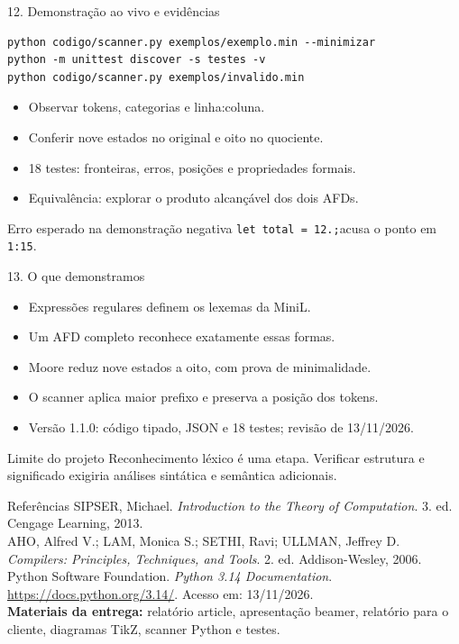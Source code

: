 \documentclass[aspectratio=169,11pt]{beamer}
\begin{document}
\begin{frame}[fragile]{12. Demonstração ao vivo e evidências}
\begin{lstlisting}[language={}]
python codigo/scanner.py exemplos/exemplo.min --minimizar
python -m unittest discover -s testes -v
python codigo/scanner.py exemplos/invalido.min
\end{lstlisting}
\begin{itemize}
\item Observar tokens, categorias e linha:coluna.
\item Conferir nove estados no original e oito no quociente.
\item 18 testes: fronteiras, erros, posições e propriedades formais.
\item Equivalência: explorar o produto alcançável dos dois AFDs.
\end{itemize}
\begin{alertblock}{Erro esperado na demonstração negativa}
\texttt{let total = 12.;}\quad acusa o ponto em \texttt{1:15}.
\end{alertblock}
\end{frame}

\begin{frame}{13. O que demonstramos}
\begin{itemize}
\item Expressões regulares definem os lexemas da MiniL.
\item Um AFD completo reconhece exatamente essas formas.
\item Moore reduz nove estados a oito, com prova de minimalidade.
\item O scanner aplica maior prefixo e preserva a posição dos tokens.
\item Versão 1.1.0: código tipado, JSON e 18 testes; revisão de 13/11/2026.
\end{itemize}
\begin{block}{Limite do projeto}
Reconhecimento léxico é uma etapa. Verificar estrutura e significado exigiria
análises sintática e semântica adicionais.
\end{block}
\end{frame}

\begin{frame}{Referências}
\small
SIPSER, Michael. \emph{Introduction to the Theory of Computation}.
3. ed. Cengage Learning, 2013.\\[5mm]
AHO, Alfred V.; LAM, Monica S.; SETHI, Ravi; ULLMAN, Jeffrey D.
\emph{Compilers: Principles, Techniques, and Tools}.
2. ed. Addison-Wesley, 2006.\\[3mm]
Python Software Foundation. \emph{Python 3.14 Documentation}.\\
\url{https://docs.python.org/3.14/}. Acesso em: 13/11/2026.\\[4mm]
\textbf{Materiais da entrega:} relatório article, apresentação beamer,
relatório para o cliente, diagramas TikZ, scanner Python e testes.
\end{frame}
\end{document}
